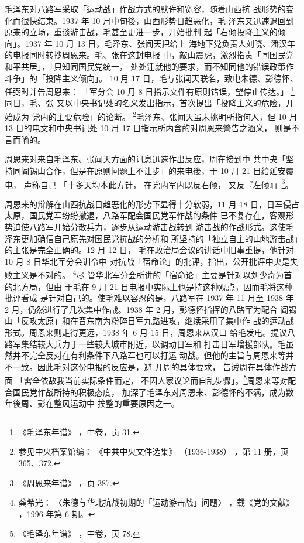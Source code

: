 毛泽东对八路军采取「运动战」作战方式的默许和宽容，随着山西抗
战形势的变化而很快结束。1937 年 10 月中旬後，山西形势日趋恶化，毛
泽东又迅速退回到原来的立场，重谈游击战，毛甚至更进一步，开始批判
起「右倾投降主义的倾向」。1937 年 10 月 13 日，毛泽东、张闻天把给上
海地下党负责人刘晓、潘汉年的电报同时转抄周恩来。毛、张在这封电报
中，敲山震虎，激烈指责「同国民党和平共居」，「只知同国民党统一，
处处迁就他的要求，而不知同他的错误政策作斗争」的「投降主义倾向」。
10 月 17 日，毛与张闻天联名，致电朱德、彭德怀、任弼时并告周恩来：
「军分会 10 月 8 日指示文件有原则错误，望停止传达。」
\footnote{《毛泽东年谱》
，中卷，页 31.}同日，毛、张
又以中央书记处的名义发出指示，首次提出「投降主义的危险，开始成为
党内的主要危险」的论断。 \footnote{参见中央档案馆编：
《中共中央文件选集》
（1936-1938）
，第 11 册，页 365、372.}毛泽东、张闻天虽未挑明所指何人，但 10 月
13 日的电文和中央书记处 10 月 17 日指示所内含的对周恩来警告之涵义，
则是不言而喻的。

周恩来对来自毛泽东、张闻天方面的讯息迅速作出反应，周在接到中
共中央「坚持同阎锡山合作，但是在原则问题上不让步」的来电後，于 10
月 21 日给延安覆电，
声称自己
「十多天均本此方针，
在党内军内既反右倾，
又反『左倾』」\footnote{《周恩来年谱》
，页 387.}。

周恩来的辩解在山西抗战日趋恶化的形势下显得十分软弱，11 月 18
日，日军侵占太原，国民党军纷纷撤退，八路军配会国民党军作战的条件
已不复存在，客观形势迫使八路军开始分散兵力，逐步从运动游击战转到
游击战的作战形式。这使毛泽东更加确信自己原先对国民党抗战的分析和
所坚持的「独立自主的山地游击战」的主张是完全正确的。12 月 12 日，
毛在政治局会议的讲话中旧事重提，他针对 10 月 8 日华北军分会训令中
对抗战「宿命论」的批评，指出，公开批评中央是失败主义是不对的。
\footnote{龚希光：
〈朱德与华北抗战初期的「运动游击战」问题〉
，载《党的文献》
，1996 年第 6 期。}尽
管华北军分会所讲的「宿命论」主要是针对以刘少奇为首的北方局，但由
于毛在 9 月 21 日电报中实际上也是持这种观点，因而毛将这种批评看成
是针对自己的。使毛难以容忍的是，八路军在 1937 年 11 月至 1938 年 2
月，仍然进行了几次集中作战。1938 年 2 月，彭德怀指挥的八路军为配合
阎锡山「反攻太原」和在晋东南为粉碎日军九路进攻，继续采用了集中作
战的运动战形式。周恩来则走得更远，1938 年 6 月 15 日，周恩来从汉口
给毛发电。提议八路军集结较大兵力于一些较大城市附近，以调动日军和
打击日军增援部队。毛虽然并不完全反对在有利条件下八路军也可以打运
动战。但他的主旨与周恩来等并不一致。因此毛对这份电报的反应是，避
开周的具体要求，
告诫周在具体作战方面
「需全依敌我当前实际条件而定，
不因人家议论而自乱步骤」。\footnote{《毛泽东年谱》
，中卷，页 78.}周恩来等对配合国民党作战所持的积极态度，
加深了毛泽东对周恩来、彭德怀的不满，成为数年後周、彭在整风运动中
挨整的重要原因之一。
 
